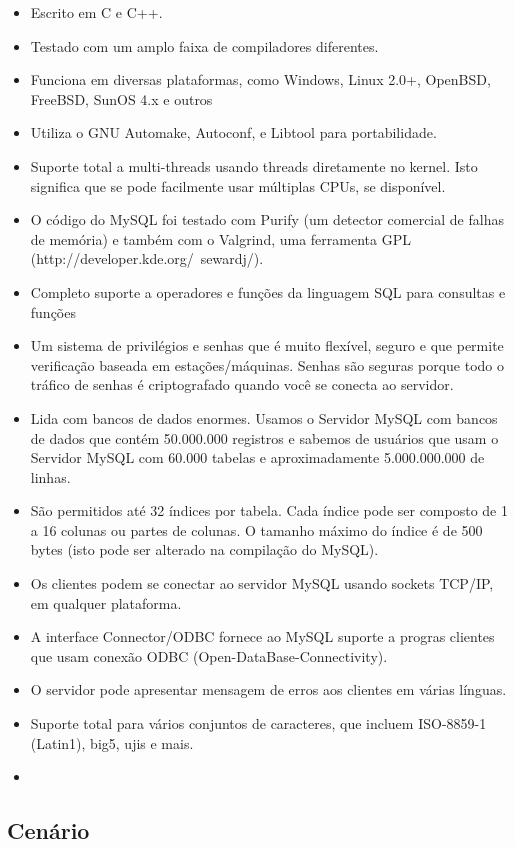 \documentclass[conference]{IEEEtran}
\begin{document}
\begin{itemize}
\item Escrito em C e C++.
\item Testado com um amplo faixa de compiladores diferentes.
\item Funciona em diversas plataformas, como Windows, Linux 2.0+, OpenBSD, FreeBSD, SunOS 4.x e outros
\item Utiliza o GNU Automake, Autoconf, e Libtool para portabilidade.
\item Suporte total a multi-threads usando threads diretamente no kernel. Isto significa que se pode facilmente usar múltiplas CPUs, se disponível.
\item O código do MySQL foi testado com Purify (um detector comercial de falhas de memória) e também com o Valgrind, uma ferramenta GPL (http://developer.kde.org/~sewardj/).
\item Completo suporte a operadores e funções da linguagem SQL para consultas e funções
\item Um sistema de privilégios e senhas que é muito flexível, seguro e que permite verificação baseada em estações/máquinas. Senhas são seguras porque todo o tráfico de senhas é criptografado quando você se conecta ao servidor.
\item Lida com bancos de dados enormes. Usamos o Servidor MySQL com bancos de dados que contém 50.000.000 registros e sabemos de usuários que usam o Servidor MySQL com 60.000 tabelas e aproximadamente 5.000.000.000 de linhas.
\item São permitidos até 32 índices por tabela. Cada índice pode ser composto de 1 a 16 colunas ou partes de colunas. O tamanho máximo do índice é de 500 bytes (isto pode ser alterado na compilação do MySQL). 
\item Os clientes podem se conectar ao servidor MySQL usando sockets TCP/IP, em qualquer plataforma.
\item A interface Connector/ODBC fornece ao MySQL suporte a progras clientes que usam conexão ODBC (Open-DataBase-Connectivity). 
\item O servidor pode apresentar mensagem de erros aos clientes em várias línguas. 
\item Suporte total para vários conjuntos de caracteres, que incluem ISO-8859-1 (Latin1), big5, ujis e mais.
\item
\end{itemize}


  \subsection{Cenário}
\end{document}
